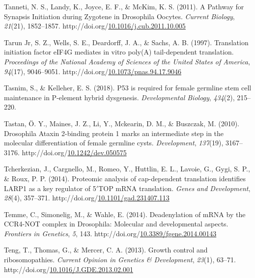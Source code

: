 \documentclass[12pt,oneside]{reedthesis}
\newlength{\cslhangindent}
\newenvironment{CSLReferences}[2] %
 {%
  \setlength{\parindent}{0pt}
  \ifodd #1 \everypar{\setlength{\hangindent}{\cslhangindent}}\ignorespaces\fi
  \ifnum #2 > 0
  \setlength{\parskip}{#2\baselineskip}
  \fi
 }%
 {}
\begin{document}
\begin{CSLReferences}{1}{0}
\leavevmode{}%
Tanneti, N. S., Landy, K., Joyce, E. F., \& McKim, K. S. (2011). A {Pathway} for {Synapsis Initiation} during {Zygotene} in {Drosophila Oocytes}. \emph{Current Biology}, \emph{21}(21), 1852--1857. http://doi.org/\href{https://doi.org/10.1016/j.cub.2011.10.005}{10.1016/j.cub.2011.10.005}

\leavevmode{}%
Tarun Jr, S. Z., Wells, S. E., Deardorff, J. A., \& Sachs, A. B. (1997). Translation initiation factor {eIF4G} mediates in vitro poly({A}) tail-dependent translation. \emph{Proceedings of the National Academy of Sciences of the United States of America}, \emph{94}(17), 9046--9051. http://doi.org/\href{https://doi.org/10.1073/pnas.94.17.9046}{10.1073/pnas.94.17.9046}

\leavevmode{}%
Tasnim, S., \& Kelleher, E. S. (2018). P53 is required for female germline stem cell maintenance in {P-element} hybrid dysgenesis. \emph{Developmental Biology}, \emph{434}(2), 215--220.

\leavevmode{}%
Tastan, Ö. Y., Maines, J. Z., Li, Y., Mckearin, D. M., \& Buszczak, M. (2010). Drosophila {Ataxin} 2-binding protein 1 marks an intermediate step in the molecular differentiation of female germline cysts. \emph{Development}, \emph{137}(19), 3167--3176. http://doi.org/\href{https://doi.org/10.1242/dev.050575}{10.1242/dev.050575}

\leavevmode{}%
Tcherkezian, J., Cargnello, M., Romeo, Y., Huttlin, E. L., Lavoie, G., Gygi, S. P., \& Roux, P. P. (2014). Proteomic analysis of cap-dependent translation identifies {LARP1} as a key regulator of 5{\({'}\)}{TOP mRNA} translation. \emph{Genes and Development}, \emph{28}(4), 357--371. http://doi.org/\href{https://doi.org/10.1101/gad.231407.113}{10.1101/gad.231407.113}

\leavevmode{}%
Temme, C., Simonelig, M., \& Wahle, E. (2014). Deadenylation of {mRNA} by the {CCR4-NOT} complex in {Drosophila}: Molecular and developmental aspects. \emph{Frontiers in Genetics}, \emph{5}, 143. http://doi.org/\href{https://doi.org/10.3389/fgene.2014.00143}{10.3389/fgene.2014.00143}

\leavevmode{}%
Teng, T., Thomas, G., \& Mercer, C. A. (2013). Growth control and ribosomopathies. \emph{Current Opinion in Genetics \& Development}, \emph{23}(1), 63--71. http://doi.org/\href{https://doi.org/10.1016/J.GDE.2013.02.001}{10.1016/J.GDE.2013.02.001}


\end{CSLReferences}
\end{document}

